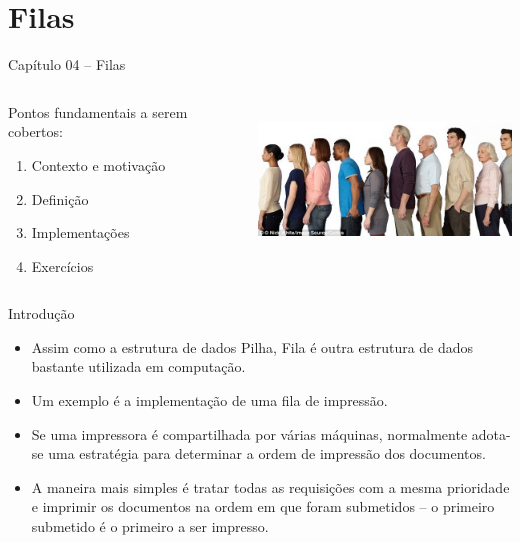 
\section{Filas}

\begin{frame}

\begin{center}
{\Large Capítulo 04 -- Filas}
\end{center}

\begin{columns}
\begin{column}{.4\textwidth}
\centering
Pontos fundamentais a serem cobertos:
  \begin{enumerate}
  \item Contexto e motivação
  \item Definição
  \item Implementações
  \item Exercícios 
\end{enumerate}  

\end{column}

\begin{column}{.6\textwidth}
\centering
\includegraphics[height=4cm, width=7cm]{figs/fig_filas/fila_pessoas.jpeg}
\end{column}

\end{columns}


\end{frame}

  \begin{frame}{Introdução}    

		\begin{itemize}
			\item Assim como a estrutura de dados Pilha, Fila é outra estrutura de dados 
			bastante utilizada em computação.
			\item Um exemplo é a implementação de uma fila de impressão.
			\item Se uma impressora é compartilhada por várias máquinas, 
			normalmente adota-se uma estratégia para determinar a ordem de impressão dos documentos.
			\item A maneira mais simples é tratar todas as requisições 
			com a mesma prioridade e imprimir os documentos na ordem em que 
			foram submetidos -- o primeiro submetido é o primeiro a ser impresso.
		\end{itemize}
  \end{frame}

